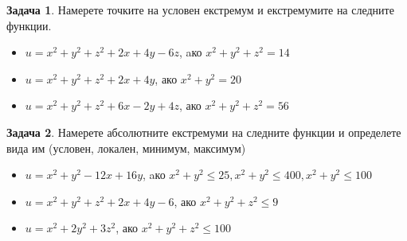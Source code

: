\documentclass[a4paper,fleqn,12pt]{article}
\theoremstyle{definition}
\newtheorem{task}{Задача}[subsection]
\begin{document}
\begin{task}
Намерете точките на условен екстремум и екстремумите на следните функции.
\begin{itemize}
\item $u = x^2 + y^2+ z^2 +2x + 4y -6z $, aко $ x^2 + y^2+ z^2 = 14$
\item $u = x^2 + y^2 + z^2 + 2x + 4y $, ако $x^2 + y^2 = 20$
\item $u = x^2 + y^2+ z^2 +6x - 2y + 4z $, ако $x^2 + y^2+ z^2 = 56$ 
\end{itemize}
\end{task}

\begin{task}
Намерете абсолютните екстремуми на следните функции и определете вида им (условен, локален, минимум, максимум)
\begin{itemize}
\item $u = x^2 + y^2 - 12x + 16y$, aко $ x^2 + y^2 \leq 25, x^2 + y^2 \leq 400, x^2 + y^2 \leq 100$
\item $u = x^2 + y^2+ z^2 +2x + 4y -6 $, ако $x^2 + y^2 + z^2 \leq 9$
\item $u = x^2 + 2y^2+ 3z^2$, ако $x^2 + y^2+ z^2 \leq 100$ 
\end{itemize}
\end{task}
\end{document}
